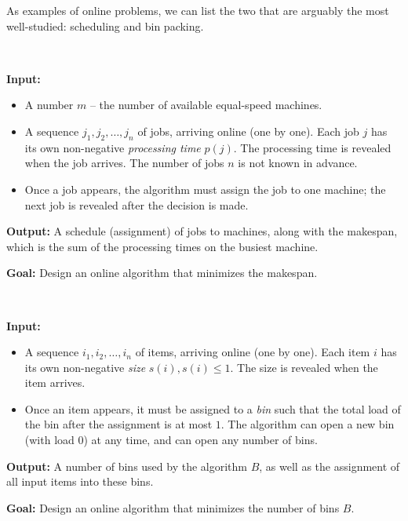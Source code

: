 As examples of online problems, we can list the two that are arguably
the most well-studied: scheduling and bin packing.

\begin{prb}[\scheduling]~\label{prb:scheduling}
\smallskip

\noindent\textbf{Input:}
\begin{itemize}
\item A number $m$ -- the number of available equal-speed machines.
\item A sequence $j_1, j_2, …, j_n$ of jobs, arriving online (one by one). Each job $j$ has its own non-negative \emph{processing time} $p(j)$. The processing time is revealed when the job arrives. The number of jobs $n$ is not known in advance.
\item Once a job appears, the algorithm must assign the job to one machine; the next job is revealed after the decision is made.
\end{itemize}

\noindent\textbf{Output:} A schedule (assignment) of jobs to machines,
along with the makespan, which is the sum of the processing times on
the busiest machine.

\noindent\textbf{Goal:} Design an online algorithm that minimizes the
makespan.
\end{prb}

\begin{prb}[\binpacking]~\label{prb:binpacking}
\smallskip

\noindent\textbf{Input:}
\begin{itemize}
\item A sequence $i_1, i_2, …, i_n$ of items, arriving online (one by one). Each item $i$ has its own non-negative \emph{size} $s(i), s(i) \le 1$. The size is revealed when the item arrives.
\item Once an item appears, it must be assigned to a \emph{bin} such that the total load of the bin after the assignment is at most $1$. The algorithm can open a new bin (with load $0$) at any time, and can open any number of bins.
\end{itemize}

\noindent\textbf{Output:} A number of bins used by the algorithm $B$, as well as
the assignment of all input items into these bins.

\noindent\textbf{Goal:} Design an online algorithm that minimizes the number of bins $B$.
\end{prb}

\medskip


